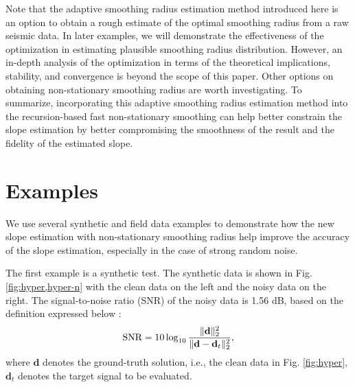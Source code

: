 Note that the adaptive smoothing radius estimation method introduced here is an option to obtain a rough estimate of the optimal smoothing radius from a raw seismic data. In later examples, we will demonstrate the effectiveness of the optimization in estimating plausible smoothing radius distribution. However, an in-depth analysis of the optimization in terms of the theoretical implications, stability, and convergence is beyond the scope of this paper. Other options on obtaining non-stationary smoothing radius are worth investigating. To summarize, incorporating this adaptive smoothing radius estimation method into the recursion-based fast non-stationary smoothing can help better constrain the slope estimation by better compromising the smoothness of the result and the fidelity of the estimated slope. 

\section{Examples}
We use several synthetic and field data examples to demonstrate how the new slope estimation with non-stationary smoothing radius help improve the accuracy of the slope estimation, especially in the case of strong random noise. 

The first example is a synthetic test. The synthetic data is shown in Fig. \ref{fig:hyper,hyper-n} with the clean data on the left and the noisy data on the right. The signal-to-noise ratio (SNR) of the noisy data is 1.56 dB, based on the definition expressed below \cite{benfeng2019efficient}:
\begin{equation}
\label{eq:diff}
\text{SNR}=10\log_{10}\frac{\Arrowvert \mathbf{d} \Arrowvert_2^2}{\Arrowvert \mathbf{d} -\mathbf{d}_t\Arrowvert_2^2},
\end{equation}
where $\mathbf{d}$ denotes the ground-truth solution, i.e., the clean data in Fig. \ref{fig:hyper},  $\mathbf{d}_t$ denotes the target signal to be evaluated. 

